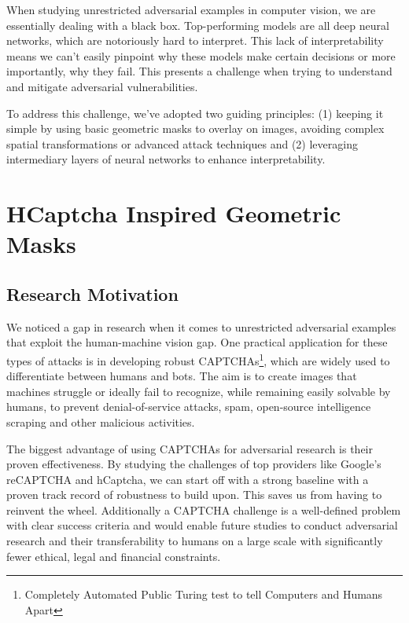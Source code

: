 \documentclass[a4paper, oneside]{discothesis}
\begin{document}
When studying unrestricted adversarial examples in computer vision, we are essentially dealing with a black box. Top-performing models are all deep neural networks, which are notoriously hard to interpret. This lack of interpretability means we can't easily pinpoint why these models make certain decisions or more importantly, why they fail. This presents a challenge when trying to understand and mitigate adversarial vulnerabilities.

To address this challenge, we've adopted two guiding principles: (1) keeping it simple by using basic geometric masks to overlay on images, avoiding complex spatial transformations or advanced attack techniques and (2) leveraging intermediary layers of neural networks to enhance interpretability.

% 
% 

\section{HCaptcha Inspired Geometric Masks}

\subsection{Research Motivation}

We noticed a gap in research when it comes to unrestricted adversarial examples that exploit the human-machine vision gap. One practical application for these types of attacks is in developing robust CAPTCHAs\footnote{Completely Automated Public Turing test to tell Computers and Humans Apart}, which are widely used to differentiate between humans and bots. The aim is to create images that machines struggle or ideally fail to recognize, while remaining easily solvable by humans, to prevent denial-of-service attacks, spam, open-source intelligence scraping and other malicious activities.

The biggest advantage of using CAPTCHAs for adversarial research is their proven effectiveness. By studying the challenges of top providers like Google's reCAPTCHA and hCaptcha, we can start off with a strong baseline \textendash{} with a proven track record of robustness \textendash{} to build upon. This saves us from having to reinvent the wheel. Additionally a CAPTCHA challenge is a well-defined problem with clear success criteria and would enable future studies to conduct adversarial research and their transferability to humans on a large scale with significantly fewer ethical, legal and financial constraints.
\end{document}
